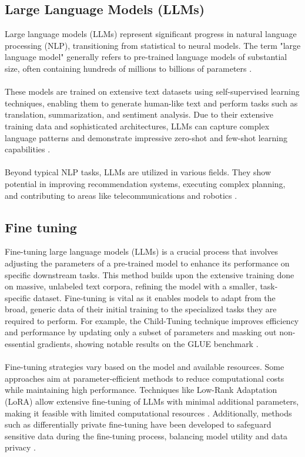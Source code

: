 \subsection*{Large Language Models (LLMs)}
Large language models (LLMs) represent significant progress in natural language processing (NLP), transitioning from statistical to neural models. The term "large language model" generally refers to pre-trained language models of substantial size, often containing hundreds of millions to billions of parameters \cite{zhao2023survey}.
\\\\
These models are trained on extensive text datasets using self-supervised learning techniques, enabling them to generate human-like text and perform tasks such as translation, summarization, and sentiment analysis. Due to their extensive training data and sophisticated architectures, LLMs can capture complex language patterns and demonstrate impressive zero-shot and few-shot learning capabilities \cite{naveed2024comprehensive}.
\\\\
Beyond typical NLP tasks, LLMs are utilized in various fields. They show potential in improving recommendation systems, executing complex planning, and contributing to areas like telecommunications and robotics \cite{10305960} \cite{fan2023fatellm}.

\subsection*{Fine tuning}
Fine-tuning large language models (LLMs) is a crucial process that involves adjusting the parameters of a pre-trained model to enhance its performance on specific downstream tasks. This method builds upon the extensive training done on massive, unlabeled text corpora, refining the model with a smaller, task-specific dataset. Fine-tuning is vital as it enables models to adapt from the broad, generic data of their initial training to the specialized tasks they are required to perform. For example, the Child-Tuning technique improves efficiency and performance by updating only a subset of parameters and masking out non-essential gradients, showing notable results on the GLUE benchmark \cite{xu-etal-2021-raise}.
\\\\
Fine-tuning strategies vary based on the model and available resources. Some approaches aim at parameter-efficient methods to reduce computational costs while maintaining high performance. Techniques like Low-Rank Adaptation (LoRA) allow extensive fine-tuning of LLMs with minimal additional parameters, making it feasible with limited computational resources \cite{sun2023comparative}. Additionally, methods such as differentially private fine-tuning have been developed to safeguard sensitive data during the fine-tuning process, balancing model utility and data privacy \cite{yu2022differentially}.

